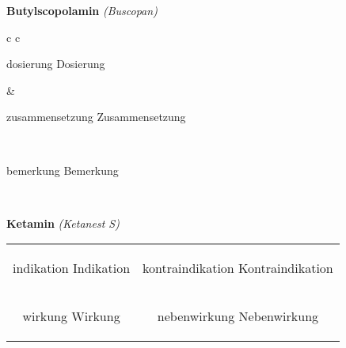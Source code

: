 \documentclass[12pt]{beamer}
\begin{document}
\begin{frame}{
    \textbf{Butylscopolamin}
    \textit{(Buscopan)}
}
    \begin{tabular}{c c}
        \begin{beamercolorbox}[wd=\boxwidth\textwidth,ht=\boxheight\textheight,sep=1em]{dosierung}
        Dosierung
        \end{beamercolorbox} & 
        \begin{beamercolorbox}[wd=\boxwidth\textwidth,ht=\boxheight\textheight,sep=1em]{zusammensetzung}
        Zusammensetzung
        \end{beamercolorbox} \\
        \begin{beamercolorbox}[wd=\textwidth,ht=\boxheight\textheight,sep=1em]{bemerkung}
        Bemerkung
        \end{beamercolorbox} \\
    \end{tabular}
\end{frame}

\begin{frame}{
    \textbf{Ketamin}
    \textit{(Ketanest S)}
}
    \begin{tabular}{c c}
        \begin{beamercolorbox}[wd=\boxwidth\textwidth,ht=\boxheight\textheight,sep=1em]{indikation}
        Indikation
        \end{beamercolorbox} & 
        \begin{beamercolorbox}[wd=\boxwidth\textwidth,ht=\boxheight\textheight,sep=1em]{kontraindikation}
        Kontraindikation 
        \end{beamercolorbox} \\
        \begin{beamercolorbox}[wd=\boxwidth\textwidth,ht=\boxheight\textheight,sep=1em]{wirkung}
        Wirkung
        \end{beamercolorbox} & 
        \begin{beamercolorbox}[wd=\boxwidth\textwidth,ht=\boxheight\textheight,sep=1em]{nebenwirkung}
        Nebenwirkung
        \end{beamercolorbox} \\
    \end{tabular}
\end{frame}
\end{document}
